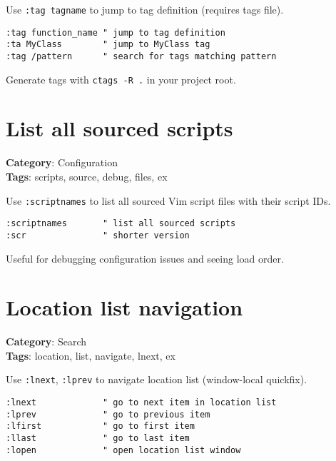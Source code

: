 {{{{{{Use {\footnotesize \Verb§:tag tagname§} to jump to tag definition (requires tags file).

\begin{Exa*}{}
\begin{Verbatim}[fontsize=\footnotesize, breaklines, breakanywhere]
:tag function_name " jump to tag definition
:ta MyClass        " jump to MyClass tag
:tag /pattern      " search for tags matching pattern
\end{Verbatim}
\end{Exa*}

Generate tags with {\footnotesize \Verb§ctags -R .§} in your project root.

\section{List all sourced scripts}

\textbf{Category}: Configuration\\ \textbf{Tags}: scripts, source, debug, files, ex
\vspace{0.5cm}

Use {\footnotesize \Verb§:scriptnames§} to list all sourced Vim script files with their script IDs.

\begin{Exa*}{}
\begin{Verbatim}[fontsize=\footnotesize, breaklines, breakanywhere]
:scriptnames       " list all sourced scripts
:scr               " shorter version
\end{Verbatim}
\end{Exa*}

Useful for debugging configuration issues and seeing load order.

\section{Location list navigation}

\textbf{Category}: Search\\ \textbf{Tags}: location, list, navigate, lnext, ex
\vspace{0.5cm}

Use {\footnotesize \Verb§:lnext§}, {\footnotesize \Verb§:lprev§} to navigate location list (window-local quickfix).

\begin{Exa*}{}
\begin{Verbatim}[fontsize=\footnotesize, breaklines, breakanywhere]
:lnext             " go to next item in location list
:lprev             " go to previous item
:lfirst            " go to first item
:llast             " go to last item
:lopen             " open location list window
\end{Verbatim}
\end{Exa*}

}}}}}}
